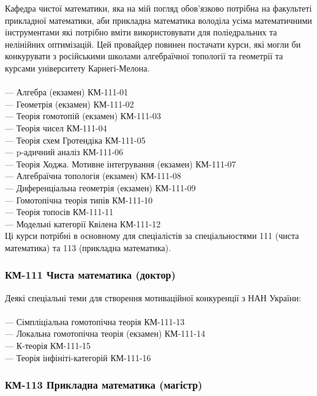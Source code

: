 Кафедра чистої математики, яка на мій погляд обов'язково
потрібна на факультеті прикладної математики, аби прикладна
математика володіла усіма математичними інструментами які
потрібно вміти використовувати для поліедральних та нелінійних
оптимізацій. Цей провайдер повинен постачати курси, які могли
би конкурувати з російськими школами алгебраїчної топології
та геометрії та курсами університету Карнегі-Мелона.
\\
\\
\noindent--- Алгебра (екзамен) КМ-111-01\\
--- Геометрія (екзамен) КМ-111-02\\
--- Теорія гомотопій (екзамен) КМ-111-03\\
--- Теорія чисел КМ-111-04\\
--- Теорія схем Гротендіка КМ-111-05\\
--- p-адичний аналіз КМ-111-06\\
--- Теорія Ходжа. Мотивне інтегрування (екзамен) КМ-111-07\\
--- Алгебраїчна топологія (екзамен) КМ-111-08\\
--- Диференціальна геометрія (екзамен) КМ-111-09\\
--- Гомотопічна теорія типів КМ-111-10\\
--- Теорія топосів КМ-111-11\\
--- Модельні категорії Квілена КМ-111-12\\

Ці курси потрібні в основному для спеціалістів за
спеціальностями 111 (чиста математика) та 113 (прикладна математика).

\subsubsection*{КМ-111 Чиста математика (доктор)}

Деякі спеціальні теми для створення мотиваційної конкуренції з НАН України:
\\
\\
\noindent--- Сімпліціальна гомотопічна теорія КМ-111-13\\
--- Локальна гомотопічна теорія (екзамен) КМ-111-14\\
--- К-теорія КМ-111-15\\
--- Теорія інфініті-категорій КМ-111-16\\

\subsubsection*{КМ-113 Прикладна математика (магістр)}

